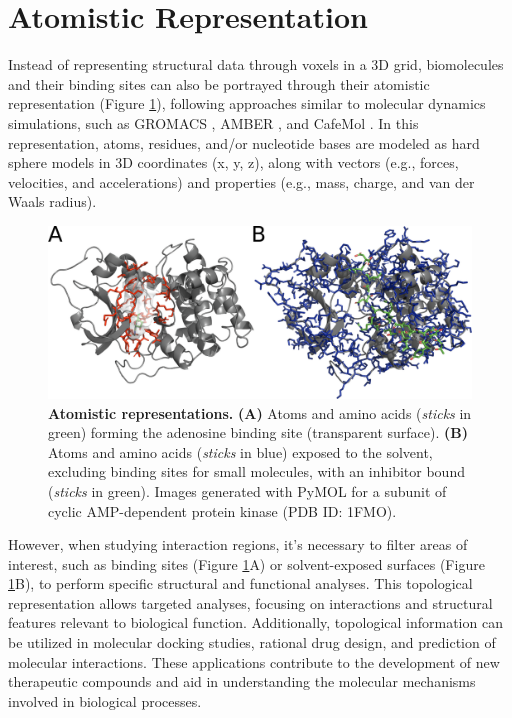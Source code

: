 \documentclass[Ingles]{phdthesis}
\def\eg{e.g.\onedot}
\begin{document}
\section{Atomistic Representation}


Instead of representing structural data through voxels in a 3D grid, biomolecules and their binding sites can also be portrayed through their atomistic representation (Figure \ref{fig:atomistic-representation}), following approaches similar to molecular dynamics simulations, such as GROMACS \cite{gromacs}, AMBER \cite{amber}, and CafeMol \cite{kenzaki2011}. In this representation, atoms, residues, and/or nucleotide bases are modeled as hard sphere models in 3D coordinates (x, y, z), along with vectors (\eg, forces, velocities, and accelerations) and properties (\eg, mass, charge, and van der Waals radius).

\begin{figure}[ht]
  \centerline{\includegraphics[scale=2]{images/atomistic-representation.png}}
  \caption[Atomistic representations]{\textbf{Atomistic representations.} \textbf{(A)} Atoms and amino acids (\textit{sticks} in green) forming the adenosine binding site (transparent surface). \textbf{(B)} Atoms and amino acids (\textit{sticks} in blue) exposed to the solvent, excluding binding sites for small molecules, with an inhibitor bound (\textit{sticks} in green). Images generated with PyMOL for a subunit of cyclic AMP-dependent protein kinase (PDB ID: 1FMO).}
  \label{fig:atomistic-representation}
\end{figure}

However, when studying interaction regions, it's necessary to filter areas of interest, such as binding sites (Figure \ref{fig:atomistic-representation}A) or solvent-exposed surfaces (Figure \ref{fig:atomistic-representation}B), to perform specific structural and functional analyses. This topological representation allows targeted analyses, focusing on interactions and structural features relevant to biological function. Additionally, topological information can be utilized in molecular docking studies, rational drug design, and prediction of molecular interactions. These applications contribute to the development of new therapeutic compounds and aid in understanding the molecular mechanisms involved in biological processes.
\end{document}
